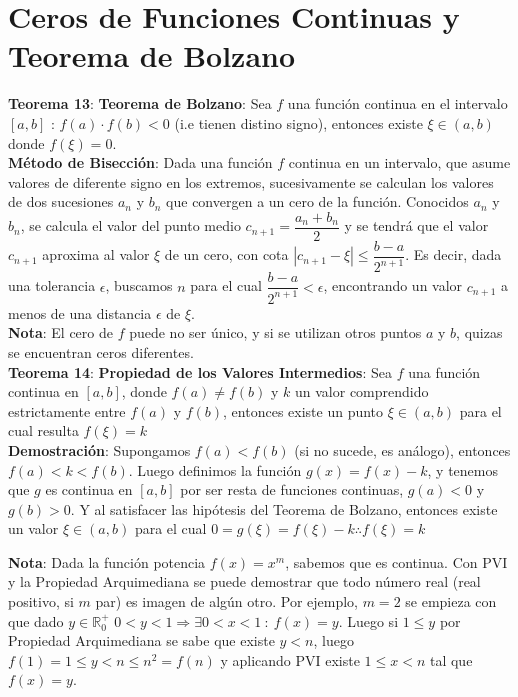 \documentclass[11pt,a4paper]{article}
\begin{document}
\section{Ceros de Funciones Continuas y Teorema de Bolzano}
\noindent \textbf{Teorema 13}: \textbf{Teorema de Bolzano}: Sea $f$ una funci\'on continua en el intervalo $[a,b]$ : $f(a)\cdot f(b) < 0$ (i.e tienen distino signo), entonces existe $\xi \in (a,b)$ donde $f(\xi) = 0$.\\

\noindent \textbf{M\'etodo de Bisecci\'on}: Dada una funci\'on $f$ continua en un intervalo, que asume valores de diferente signo en los extremos, sucesivamente se calculan los valores de dos sucesiones $a_n$ y $b_n$ que convergen a un cero de la funci\'on. Conocidos $a_n$ y $b_n$, se calcula el valor del punto medio $c_{n+1} = \dfrac{a_n+b_n}{2}$ y se tendr\'a que el valor $c_{n+1}$ aproxima al valor $\xi$ de un cero, con cota $|c_{n+1} - \xi| \leq \dfrac{b-a}{2^{n+1}}$. Es decir, dada una tolerancia $\epsilon$, buscamos $n$ para el cual $\dfrac{b-a}{2^{n+1}} < \epsilon$, encontrando un valor $c_{n+1}$ a menos de una distancia $\epsilon$ de $\xi$.\\

\textbf{Nota}: El cero de $f$ puede no ser \'unico, y si se utilizan otros puntos $a$ y $b$, quizas se encuentran ceros diferentes.\\

\noindent \textbf{Teorema 14}: \textbf{Propiedad de los Valores Intermedios}: Sea $f$ una funci\'on continua en $[a,b]$, donde $f(a) \not = f(b)$ y $k$ un valor comprendido estrictamente entre $f(a)$ y $f(b)$, entonces existe un punto $\xi \in (a,b)$ para el cual resulta $f(\xi)=k$\\
\noindent \textbf{Demostraci\'on}: Supongamos $f(a)<f(b)$ (si no sucede, es an\'alogo), entonces $f(a)<k<f(b)$. Luego definimos la funci\'on $g(x) = f(x)-k$, y tenemos que $g$ es continua en $[a,b]$ por ser resta de funciones continuas, $g(a)<0$ y $g(b)>0$. Y al satisfacer las hip\'otesis del Teorema de Bolzano, entonces existe un valor $\xi \in (a,b)$ para el cual $0=g(\xi) = f(\xi)-k \therefore f(\xi)=k$

\textbf{Nota}: Dada la funci\'on potencia $f(x)=x^m$, sabemos que es continua. Con PVI y la Propiedad Arquimediana se puede demostrar que todo n\'umero real (real positivo, si $m$ par) es imagen de alg\'un otro. Por ejemplo, $m=2$ se empieza con que dado $y\in \mathbb{R}^+_0$ $0<y<1 \Rightarrow \exists 0<x<1\ :\ f(x)=y$. Luego si $1\leq y$ por Propiedad Arquimediana se sabe que existe $y<n$, luego $f(1)=1\leq y<n\leq n^2 = f(n)$ y aplicando PVI existe $1\leq x < n$ tal que $f(x)=y$.
\end{document}
